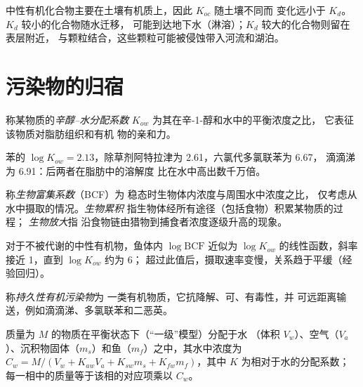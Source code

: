 中性有机化合物主要在土壤有机质上，因此 $K_{oc}$ 随土壤不同而
变化远小于 $K_d$。$K_d$ 较小的化合物随水迁移，
可能到达地下水（淋溶）；$K_d$ 较大的化合物则留在表层附近，
与颗粒结合，这些颗粒可能被侵蚀带入河流和湖泊。

\section{污染物的归宿}

\begin{definition}[辛醇–水分配系数]\label{def:b3:environmental-toxicology:kow}
称某物质的\emph{辛醇–水分配系数}
$K_{ow}$ 为其在辛-1-醇和水中的平衡浓度之比，
它表征该物质对脂肪组织和有机
物的亲和力。
\end{definition}

苯的 $\log K_{ow} = 2.13$，除草剂阿特拉津为 2.61，六氯代多氯联苯为 6.67，
滴滴涕为 6.91：后两者在脂肪中的溶解度
比在水中高出数千万倍。

\begin{definition}[生物累积]\label{def:b3:environmental-toxicology:bio}
称\emph{生物富集系数}（BCF）为
稳态时生物体内浓度与周围水中浓度之比，
仅考虑从水中摄取的情况。\emph{生物累积}
指生物体经所有途径（包括食物）积累某物质的过程；
\emph{生物放大}指
沿食物链由猎物到捕食者浓度逐级升高的现象。
\end{definition}

\begin{proposition}[BCF 与 $K_{ow}$]\label{prop:b3:environmental-toxicology:bcf-kow}
对于不被代谢的中性有机物，鱼体内 $\log\mathrm{BCF}$ 近似为
$\log K_{ow}$ 的线性函数，斜率接近 1，直到 $\log K_{ow}$ 约为 6；
超过此值后，摄取速率变慢，关系趋于平缓（经验回归）。
\admitted
\end{proposition}

\begin{definition}[持久性有机污染物]\label{def:b3:environmental-toxicology:pop}
称\emph{持久性有机污染物}为
一类有机物质，它抗降解、可、有毒性，并
可远距离输送，例如滴滴涕、多氯联苯和二恶英。
\end{definition}

\begin{proposition}[平衡状态下各相之间的分配]\label{prop:b3:environmental-toxicology:level-one}
质量为 $M$ 的物质在平衡状态下（“一级”模型）分配于水
（体积 $V_w$）、空气（$V_a$）、沉积物固体（$m_s$）和鱼（$m_f$）之中，其水中浓度为
$C_w = M/(V_w + K_{aw}V_a + K_{sw}m_s + K_{fw}m_f)$，其中 $K$ 为相对于水的分配系数；
每一相中的质量等于该相的对应项乘以 $C_w$。
\end{proposition}

